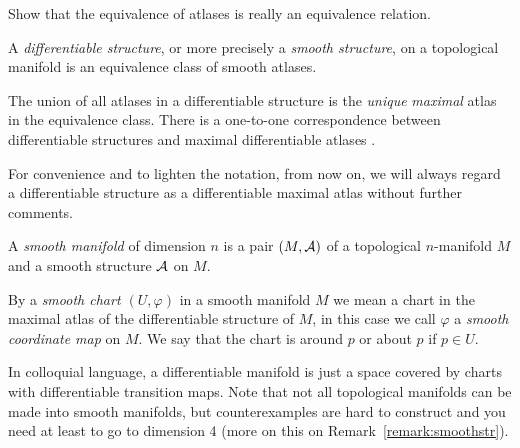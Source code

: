 \begin{exercise}
	Show that the equivalence of atlases is really an equivalence relation.
\end{exercise}

\begin{definition}\label{def:diffstr}
	A \emph{differentiable structure}, or more precisely a \emph{smooth structure}, on a topological manifold is an equivalence class of smooth atlases.
\end{definition}

\begin{remark}
	The union of all atlases in a differentiable structure is the \emph{unique} \emph{maximal} atlas in the equivalence class.
	There is a one-to-one correspondence between differentiable structures and maximal differentiable atlases \cite[Proposition 1.17]{book:lee}.
\end{remark}

\begin{tcolorbox}
	For convenience and to lighten the notation, from now on, we will always regard a differentiable structure as a differentiable maximal atlas without further comments.
\end{tcolorbox}

\begin{definition}\label{def:diffmanifold}
	A \emph{smooth manifold} of dimension $n$ is a pair $(M, \mathcal{A})$ of a topological $n$-manifold $M$ and a smooth structure $\mathcal{A}$ on $M$.
\end{definition}

\begin{notation}
	By a \emph{smooth chart $(U, \varphi)$} in a smooth manifold $M$ we mean a chart in the maximal atlas of the differentiable structure of $M$, in this case we call $\varphi$ a \emph{smooth coordinate map} on $M$. We say that the chart is around $p$ or about $p$ if $p\in U$.
\end{notation}

In colloquial language, a differentiable manifold is just a space covered by charts with differentiable transition maps.
Note that not all topological manifolds can be made into smooth manifolds, but counterexamples are hard to construct and you need at least to go to dimension 4 (more on this on Remark~\ref{remark:smoothstr}).

